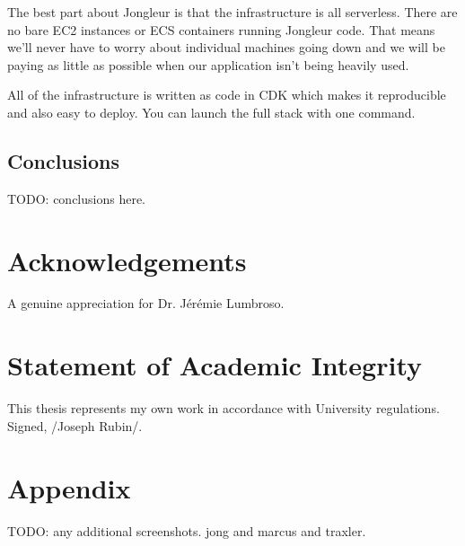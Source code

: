 \documentclass{article}
\begin{document}
The best part about Jongleur is that the infrastructure is all serverless.
There are no bare EC2 instances or ECS containers running Jongleur code.
That means we'll never have to worry about individual machines going down and we will be paying as little as possible when our application isn't being heavily used.

All of the infrastructure is written as code in CDK which makes it reproducible and also easy to deploy.
You can launch the full stack with one command.~\cite{jongleur}

\subsection{Conclusions}

TODO: conclusions here.

\section{Acknowledgements}

A genuine appreciation for Dr. Jérémie Lumbroso.

\section*{Statement of Academic Integrity}

This thesis represents my own work in accordance with University regulations.\\
Signed, /Joseph Rubin/.

%





\printindex

\section{Appendix}

TODO: any additional screenshots.
jong and marcus and traxler.
\end{document}
